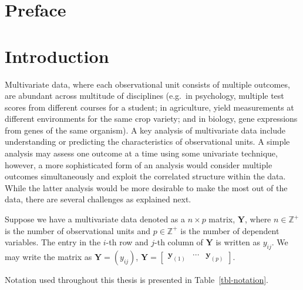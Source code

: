 \documentclass[
  a4paper,
  oneside,
  openany,
  12pt,
  onecolumn,
  twoside]{book}
\renewcommand*\contentsname{Table of contents}
\newcommand\contentsname{Table of contents}
\theoremstyle{plain}
\theoremstyle{remark}
\begin{document}
\renewcommand*\contentsname{Table of contents}
{
\setcounter{tocdepth}{2}
\tableofcontents
}
\listoffigures
{}
\listoftables

\mainmatter
{}

\chapter*{Preface}\label{preface}



\chapter{Introduction}\label{introduction}

Multivariate data, where each observational unit consists of multiple
outcomes, are abundant across multitude of disciplines (e.g.~in
psychology, multiple test scores from different courses for a student;
in agriculture, yield measurements at different environments for the
same crop variety; and in biology, gene expressions from genes of the
same organism). A key analysis of multivariate data include
understanding or predicting the characteristics of observational units.
A simple analysis may assess one outcome at a time using some univariate
technique, however, a more sophisticated form of an analysis would
consider multiple outcomes simultaneously and exploit the correlated
structure within the data. While the latter analysis would be more
desirable to make the most out of the data, there are several challenges
as explained next.

Suppose we have a multivariate data denoted as a \(n \times p\) matrix,
\(\textbf{Y}\), where \(n \in \mathbb{Z}^+\) is the number of
observational units and \(p \in \mathbb{Z}^+\) is the number of
dependent variables. The entry in the \(i\)-th row and \(j\)-th column
of \(\textbf{Y}\) is written as \(y_{ij}\). We may write the matrix as
\(\mathbf{Y} = (y_{ij})\),
\(\mathbf{Y} = \begin{bmatrix}\boldsymbol{y}_{(1)} & \cdots & \boldsymbol{y}_{(p)}\end{bmatrix}\).

Notation used throughout this thesis is presented in
Table~\ref{tbl-notation}.
\end{document}
